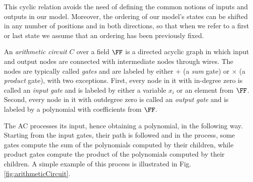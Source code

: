 \begin{enumerate}
    \begin{remark}
        This cyclic relation avoids the need of defining the common notions of inputs and outputs in our model. Moreover, the ordering of our model's states can be shifted in any number of positions and in both directions, so that when we refer to a first or last state we assume that an ordering has been previously fixed.
    \end{remark}
\end{enumerate}


\begin{definition}
    An \textit{arithmetic circuit $C$} over a field $\FF$ is a directed acyclic graph in which input and output nodes are connected with intermediate nodes through wires. The nodes are typically called \textit{gates} and are labeled by either $+$ (a \textit{sum} gate) or $\times$ (a \textit{product} gate), with two exceptions. First, every node in it with in-degree zero is called an \textit{input gate} and is labeled by either a variable $x_i$ or an element from $\FF$. Second, every node in it with outdegree zero is called an \textit{output gate} and is labeled by a polynomial with coefficients from $\FF$.
    
    The AC processes its input, hence obtaining a polynomial, in the following way. Starting from the input gates, their path is followed and in the process, some gates compute the sum of the polynomials computed by their children, while product gates compute the product of the polynomials computed by their children. A simple example of this process is illustrated in Fig. \ref{fig:arithmeticCircuit}.
\end{definition}

